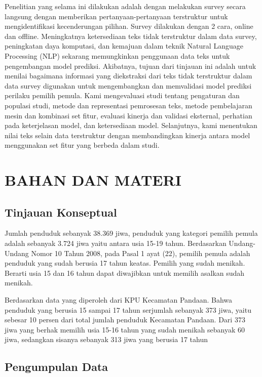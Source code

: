 \documentclass[letterpaper, 10 pt, conference]{ieeeconf}  %
\begin{document}
Penelitian yang selama ini dilakukan adalah dengan melakukan survey secara langsung dengan memberikan pertanyaan-pertanyaan terstruktur untuk mengidentifikasi kecenderungan pilihan. Survey dilakukan dengan 2 cara, online dan offline. Meningkatnya ketersediaan teks tidak terstruktur dalam data survey, peningkatan daya komputasi, dan kemajuan dalam teknik Natural Language Processing (NLP) sekarang memungkinkan penggunaan data teks untuk pengembangan model prediksi. Akibatnya, tujuan dari tinjauan ini adalah untuk menilai bagaimana informasi yang diekstraksi dari teks tidak terstruktur dalam data survey digunakan untuk mengembangkan dan memvalidasi model prediksi perilaku pemilih pemula. Kami mengevaluasi studi tentang pengaturan dan populasi studi, metode dan representasi pemrosesan teks, metode pembelajaran mesin dan kombinasi set fitur, evaluasi kinerja dan validasi eksternal, perhatian pada keterjelasan model, dan ketersediaan model. Selanjutnya, kami menentukan nilai teks selain data terstruktur dengan membandingkan kinerja antara model menggunakan set fitur yang berbeda dalam studi.


\section{BAHAN DAN MATERI}

\subsection{Tinjauan Konseptual}

Jumlah penduduk sebanyak 38.369 jiwa, penduduk yang kategori pemilih pemula adalah sebanyak 3.724 jiwa yaitu antara usia 15-19 tahun. Berdasarkan Undang-Undang Nomor 10 Tahun 2008, pada Pasal 1 ayat (22), pemilih pemula adalah penduduk yang sudah berusia 17 tahun keatas. Pemilih yang sudah menikah. Berarti usia 15 dan 16 tahun dapat diwajibkan untuk memilih asalkan sudah menikah.

Berdasarkan data yang diperoleh dari KPU Kecamatan Pandaan. Bahwa penduduk yang berusia 15 sampai 17 tahun serjumlah sebanyak 373 jiwa, yaitu sebesar 10 persen dari total jumlah penduduk Kecamatan Pandaan. Dari 373 jiwa yang berhak memilih usia 15-16 tahun yang sudah menikah sebanyak 60 jiwa, sedangkan sisanya sebanyak 313 jiwa yang berusia 17 tahun

\subsection{Pengumpulan Data}
\end{document}
